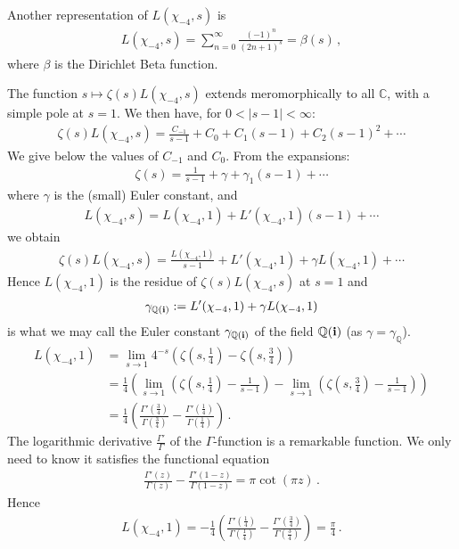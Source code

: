 \documentclass[reqno]{amsart}
\theoremstyle{plain}
\theoremstyle{definition}
\theoremstyle{remark}
\numberwithin{equation}{section}
\begin{document}
Another representation of $L(\chi_{-4},s)$ is
\begin{align*}
  L(\chi_{-4},s) = \sum_{n=0}^{\infty} \frac{(-1)^n}{(2n+1)^s} = \beta(s)\,,
\end{align*}
where $\beta$ is the Dirichlet Beta function.

The function $s\mapsto\zeta(s)L(\chi_{-4},s)$ extends meromorphically
to all ${{\mathbb C}}$, with a simple pole at $s=1$. We then have, for
$0<|s-1|<\infty$:
\begin{align*}
  \zeta(s)L(\chi_{-4},s) = \frac{C_{-1}}{s-1} + C_0 + C_1(s-1) + C_2(s-1)^2+\cdots
\end{align*}
We give below the values of $C_{-1}$ and $C_0$. From the expansions:
\begin{align*}
  \zeta(s) = \frac{1}{s-1} + \gamma + \gamma_1(s-1)+\cdots
\end{align*}
where $\gamma$ is the (small) Euler constant, and
\begin{align*}
  L(\chi_{-4},s) = L(\chi_{-4},1) + L'(\chi_{-4},1)(s-1) + \cdots
\end{align*}
we obtain
\begin{align*}
  \zeta(s)L(\chi_{-4},s) = \frac{L(\chi_{-4},1)}{s-1} + L'(\chi_{-4},1) + \gamma L(\chi_{-4},1) + \cdots
\end{align*}
Hence $L(\chi_{-4},1)$ is the residue of $\zeta(s)L(\chi_{-4},s)$ at $s=1$ and
\begin{align*}
  \gamma_{{{\mathbb Q}}({{\bf i}})} := L'(\chi_{-4},1) + \gamma L(\chi_{-4},1)
\end{align*}
is what we may call the Euler constant $\gamma_{{{\mathbb Q}}({{\bf i}})}$ of the field
${{\mathbb Q}}({{\bf i}})$ (as $\gamma=\gamma_{{\mathbb Q}}$).
\begin{align*}
  L(\chi_{-4},1) &= \lim_{s\to 1} 4^{-s}\left(\zeta\left(s,\frac14\right) - \zeta\left(s,\frac34\right)\right)\\
                &= \frac14\left(\lim_{s\to 1}\left(\zeta\left(s,\frac14\right)-\frac{1}{s-1}\right)-
                  \lim_{s\to 1}\left(\zeta\left(s,\frac34\right)-\frac{1}{s-1}\right)\right)\\
                &= \frac14\left(\frac{\Gamma'\left(\frac34\right)}{\Gamma\left(\frac34\right)}
                  -\frac{\Gamma'\left(\frac14\right)}{\Gamma\left(\frac14\right)}\right)\,.
\end{align*}
The logarithmic derivative $\displaystyle\frac{\Gamma'}{\Gamma}$ of
the $\Gamma$-function is a remarkable function. We only need to know
it satisfies the functional equation
\begin{align*}
  \frac{\Gamma'(z)}{\Gamma(z)} - \frac{\Gamma'(1-z)}{\Gamma(1-z)}
  = \pi\cot(\pi z)\,.
\end{align*}
Hence
\begin{align*}
  L(\chi_{-4},1) = -\frac14\left(\frac{\Gamma'\left(\frac14\right)}{\Gamma\left(\frac14\right)}
                  -\frac{\Gamma'\left(\frac34\right)}{\Gamma\left(\frac34\right)}\right)
  =\frac{\pi}{4}\,.
\end{align*}
\end{document}
